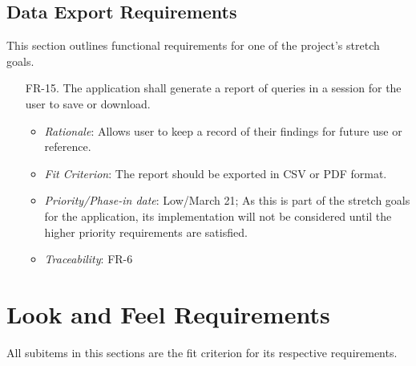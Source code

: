\documentclass[12pt]{article}
\begin{document}
\subsection{Data Export Requirements}
This section outlines functional requirements for one of the project's stretch
goals.
\begin{enumerate}
  \item[FR-15.] The application shall generate a report of queries in a session for the user to save or download.
  \begin{itemize}
    \item \textit{Rationale}: Allows user to keep a record of their findings for future use or reference.
    \item \textit{Fit Criterion}: The report should be exported in CSV or PDF format.
    \item \textit{Priority/Phase-in date}: Low/March 21; As this is part of the stretch goals for the application, its implementation will not be considered until the higher priority requirements are satisfied.
    \item \textit{Traceability}: FR-6
  \end{itemize}
\end{enumerate}

\section{Look and Feel Requirements}
All subitems in this sections are the fit criterion for its respective
requirements. 
\end{document}
